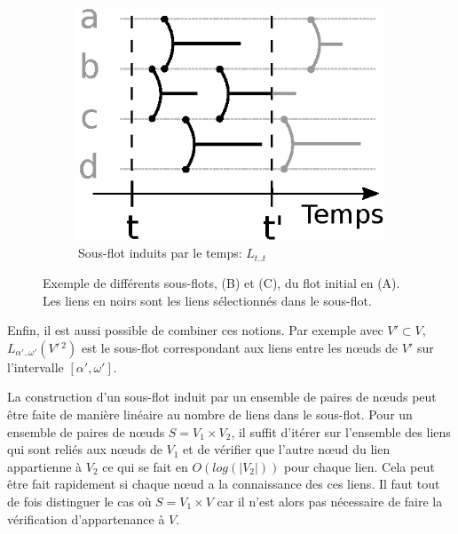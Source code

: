 \begin{figure}[]
\begin{subfigure}{0.25\linewidth}
		\includegraphics[width=\linewidth]{img/Intro/sous_flots2.eps}\hfill
		\caption{Sous-flot induits par le temps:  $L_{t..t}$}
		\label{fig:exemple_sous_flot2}	
	\end{subfigure}
	\caption{Exemple de différents sous-flots, (B) et (C), du flot initial en (A). Les liens en noirs sont les liens sélectionnés dans le sous-flot. }
\label{fig:exemple_sous_flot}
\end{figure}
Enfin, il est aussi possible de combiner ces notions.
Par exemple avec $V' \subset V$, $L_{\alpha'..\omega'}(V'\,^2)$ est le sous-flot correspondant aux liens entre les n\oe uds de $V'$ sur l'intervalle $[\alpha', \omega']$.

\bigskip

La construction d'un sous-flot induit par un ensemble de paires de n\oe uds peut être faite de manière linéaire au nombre de liens dans le sous-flot.
Pour un ensemble de paires de n\oe uds $S= V_1 \times V_2$, il suffit d'itérer sur l'ensemble des liens qui sont reliés aux n\oe uds de $V_1$ et de vérifier que l'autre n\oe ud du lien appartienne à $V_2$ ce qui se fait en $O(log(|V_2|))$ pour chaque lien.
Cela peut être fait rapidement si chaque n\oe ud a la connaissance des ces liens.
Il faut tout de fois distinguer le cas où $S= V_1 \times V$ car il n'est alors pas nécessaire de faire la vérification d'appartenance à $V$.

